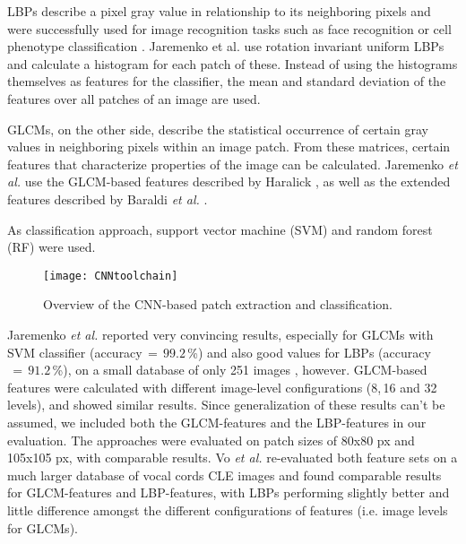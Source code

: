 \documentclass[fleqn,10pt]{wlscirep}
\begin{document}
LBPs describe a pixel gray value in
relationship to its neighboring pixels and were successfully used for
image recognition tasks such as face recognition \cite{Ahonen:2006gr}
 or cell phenotype classification \cite{Nanni:2010eb}. Jaremenko et
 al. use rotation invariant uniform LBPs and calculate a histogram for
 each patch of these. Instead of using the histograms themselves as
 features for the classifier, the mean and standard deviation of the
 features over all patches of an image are used.

GLCMs, on the other side, describe the statistical occurrence of
certain gray values in neighboring pixels within an image
patch. From these matrices, certain features that characterize properties of
the image can be calculated. Jaremenko \textit{et al.} use the GLCM-based
features described by Haralick
 \cite{Haralick:1973bs}, as
well as the extended features described by Baraldi \textit{et al.} %
\cite{Baraldi:1995js}.

As classification approach, support vector machine (SVM) and random
forest (RF) were used. 


\begin{figure*}[!t]
\centering
\texttt{[image: CNNtoolchain]}
\hfil
\caption{Overview of the CNN-based patch extraction and classification.}
\label{CNNtoolchain}
\end{figure*}



Jaremenko \textit{et al.} reported very convincing results, especially for
GLCMs with SVM classifier 
(accuracy$\,=\,99.2$\,\%) and also good values for
LBPs (accuracy$\,=\,91.2$\,\%), on a small database of only 251 images
\cite{Jaremenko:2015kh}, however. GLCM-based features were calculated with
different image-level configurations (8,\,16 and 32 levels), and showed
similar results. Since generalization of these results can't
be assumed, we included both the GLCM-features and the LBP-features in
our evaluation. The approaches were evaluated on patch sizes of 80x80 px and 105x105 px,
with comparable results. Vo \textit{et al.} re-evaluated both feature sets on a
much larger database of vocal cords CLE images \cite{Vo:2016} and
found comparable results for GLCM-features and LBP-features, with LBPs
performing slightly better and little difference amongst the different
configurations of features (i.e. image levels for GLCMs). 
\end{document}
